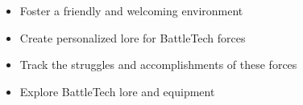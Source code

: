 \begin{itemize}

\item Foster a friendly and welcoming environment

\item Create personalized lore for BattleTech forces

\item Track the struggles and accomplishments of these forces

\item Explore BattleTech lore and equipment

\end{itemize}
